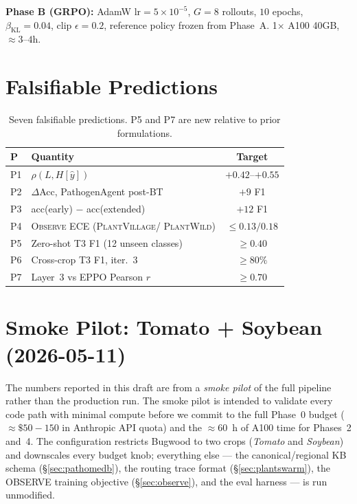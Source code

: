 \documentclass[11pt,twocolumn]{article}
\newcommand{\observe}{\textsc{Observe}\xspace}
\newcommand{\pv}{\textsc{PlantVillage}\xspace}
\newcommand{\pw}{\textsc{PlantWild}\xspace}
\begin{document}
\textbf{Phase B (GRPO):} AdamW $\text{lr}{=}5{\times}10^{-5}$,
$G{=}8$ rollouts, $10$ epochs, $\beta_\text{KL}{=}0.04$,
clip $\epsilon{=}0.2$, reference policy frozen from Phase~A.
1$\times$ A100 40GB, ${\approx}3$--$4$h.

\section{Falsifiable Predictions}
\label{app:predictions}

\begin{table}[H]\centering\small
\begin{tabular}{lp{3.2cm}c}
\toprule
\textbf{P} & \textbf{Quantity} & \textbf{Target} \\
\midrule
P1 & $\rho(L, H[\hat{y}])$ & $+0.42$--$+0.55$ \\
P2 & $\Delta$Acc, PathogenAgent post-BT & $+9$ F1 \\
P3 & acc(early) $-$ acc(extended) & $+12$ F1 \\
P4 & \observe ECE (\pv / \pw) & ${\leq}0.13/0.18$ \\
P5 & Zero-shot T3 F1 (12 unseen classes) & ${\geq}0.40$ \\
P6 & Cross-crop T3 F1, iter.\ 3 & ${\geq}80\%$ \\
P7 & Layer~3 vs EPPO Pearson $r$ & ${\geq}0.70$ \\
\bottomrule
\end{tabular}
\caption{Seven falsifiable predictions. P5 and P7
  are new relative to prior formulations.}
\label{tab:predictions}
\end{table}

\section{Smoke Pilot: Tomato + Soybean (2026-05-11)}
\label{app:smoke}

The numbers reported in this draft are from a
\emph{smoke pilot} of the full pipeline rather than the
production run. The smoke pilot is intended to validate every
code path with minimal compute before we commit to the
full Phase~0 budget (${\approx}\$50{-}150$ in Anthropic API
quota) and the ${\approx}60$~h of A100 time for Phases~2 and~4.
The configuration restricts Bugwood to two crops
(\textit{Tomato} and \textit{Soybean}) and downscales every
budget knob; everything else --- the canonical/regional KB
schema (§\ref{sec:pathomedb}), the routing trace format
(§\ref{sec:plantswarm}), the OBSERVE training objective
(§\ref{sec:observe}), and the eval harness --- is run
unmodified.
\end{document}
